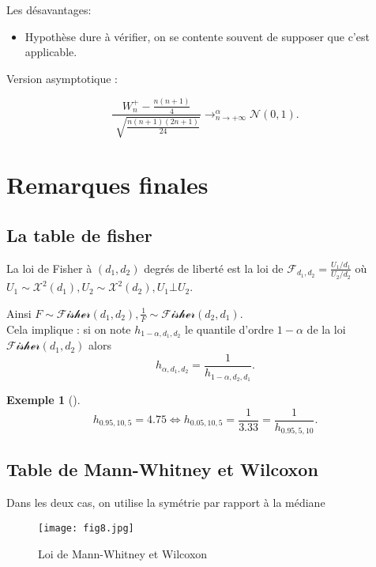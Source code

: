 \documentclass{article}
\theoremstyle{plain}%
\theoremstyle{definition}
\newtheorem{exmp}{Exemple}[section]
\theoremstyle{remark}
\begin{document}
Les désavantages:
\begin{itemize}
    \item Hypothèse dure à vérifier, on se contente souvent de supposer que c'est applicable.
\end{itemize}

Version asymptotique : 

\[
    \frac{W_n^+ - \frac{n(n+1)}{4}}{\sqrt[]{\frac{n(n+1)(2n+1)}{24}}} \to ^{\alpha }_{n \to +\infty }\mathcal{N}(0,1)
.\]

\section{Remarques finales}
\subsection{La table de fisher}
La loi de Fisher à $ (d_1, d_2) $ degrés de liberté est la loi de $ \mathcal{F}_{d_1, d_2} = \frac{U_1 / d_1}{U_2 / d_2} $ où $ U_1 \sim \mathcal{X}^2(d_1), U_2 \sim \mathcal{X}^2 (d_2), U_1 \bot U_2 $. 

Ainsi $ F \sim \mathcal{Fisher}(d_1, d_2), \frac{1}{F} \sim \mathcal{Fisher}(d_2, d_1) $.\\
Cela implique : si on note $ h_{1-\alpha , d_1, d_2} $ le quantile d'ordre $ 1 - \alpha  $ de la loi $ \mathcal{Fisher}(d_1, d_2) $ alors 
\[
    h_{\alpha, d_1, d_2} = \frac{1}{h_{1-\alpha, d_2, d_1}}
.\]
\begin{exmp}[]
    \[
        h_{0.95, 10, 5} = 4.75 \Leftrightarrow h_{0.05, 10, 5} = \frac{1}{3.33} = \frac{1}{h_{0.95, 5 ,10}}
    .\]
\end{exmp}

\subsection{Table de Mann-Whitney et Wilcoxon}
Dans les deux cas, on utilise la symétrie par rapport à la médiane 
\begin{figure}[!htbp]
    \centering
    \texttt{[image: fig8.jpg]}
    \caption{Loi de Mann-Whitney et Wilcoxon}
\end{figure}
\end{document}
